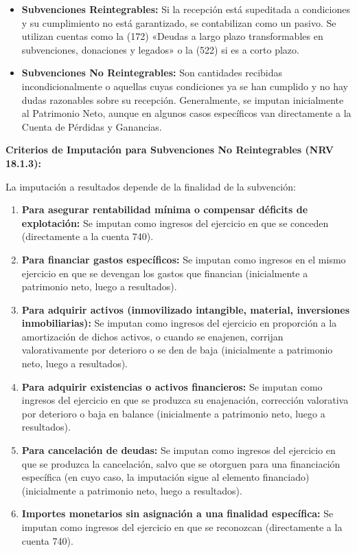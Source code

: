 \documentclass[
  paper=a4,
  ,captions=tableheading
]{scrbook}
\providecommand{\tightlist}{%
  \setlength{\itemsep}{0pt}\setlength{\parskip}{0pt}}
\begin{document}
\begin{itemize}
\tightlist
\item
  \textbf{Subvenciones Reintegrables:} Si la recepción está supeditada a
  condiciones y su cumplimiento no está garantizado, se contabilizan
  como un pasivo. Se utilizan cuentas como la (172) «Deudas a largo
  plazo transformables en subvenciones, donaciones y legados» o la (522)
  si es a corto plazo.
\item
  \textbf{Subvenciones No Reintegrables:} Son cantidades recibidas
  incondicionalmente o aquellas cuyas condiciones ya se han cumplido y
  no hay dudas razonables sobre su recepción. Generalmente, se imputan
  inicialmente al Patrimonio Neto, aunque en algunos casos específicos
  van directamente a la Cuenta de Pérdidas y Ganancias.
\end{itemize}

\textbf{Criterios de Imputación para Subvenciones No Reintegrables (NRV
18.1.3):}

La imputación a resultados depende de la finalidad de la subvención:

\begin{enumerate}
\def\labelenumi{\arabic{enumi}.}
\tightlist
\item
  \textbf{Para asegurar rentabilidad mínima o compensar déficits de
  explotación:} Se imputan como ingresos del ejercicio en que se
  conceden (directamente a la cuenta 740).
\item
  \textbf{Para financiar gastos específicos:} Se imputan como ingresos
  en el mismo ejercicio en que se devengan los gastos que financian
  (inicialmente a patrimonio neto, luego a resultados).
\item
  \textbf{Para adquirir activos (inmovilizado intangible, material,
  inversiones inmobiliarias):} Se imputan como ingresos del ejercicio en
  proporción a la amortización de dichos activos, o cuando se enajenen,
  corrijan valorativamente por deterioro o se den de baja (inicialmente
  a patrimonio neto, luego a resultados).
\item
  \textbf{Para adquirir existencias o activos financieros:} Se imputan
  como ingresos del ejercicio en que se produzca su enajenación,
  corrección valorativa por deterioro o baja en balance (inicialmente a
  patrimonio neto, luego a resultados).
\item
  \textbf{Para cancelación de deudas:} Se imputan como ingresos del
  ejercicio en que se produzca la cancelación, salvo que se otorguen
  para una financiación específica (en cuyo caso, la imputación sigue al
  elemento financiado) (inicialmente a patrimonio neto, luego a
  resultados).
\item
  \textbf{Importes monetarios sin asignación a una finalidad
  específica:} Se imputan como ingresos del ejercicio en que se
  reconozcan (directamente a la cuenta 740).
\end{enumerate}
\end{document}
